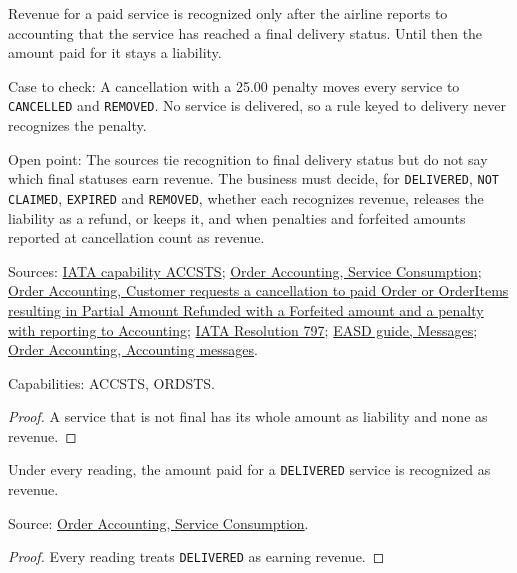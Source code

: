 \begin{theorem}
  \label{thm:accounting-revenue-at-final-status}
  Revenue for a paid service is recognized only after the airline reports to
  accounting that the service has reached a final delivery status. Until
  then the amount paid for it stays a liability.

  Case to check: A cancellation with a 25.00 penalty moves every service to
  \texttt{CANCELLED} and \texttt{REMOVED}. No service is delivered, so a
  rule keyed to delivery never recognizes the penalty.

  Open point: The sources tie recognition to final delivery status but do
  not say which final statuses earn revenue. The business must decide, for
  \texttt{DELIVERED}, \texttt{NOT CLAIMED}, \texttt{EXPIRED} and
  \texttt{REMOVED}, whether each recognizes revenue, releases the liability
  as a refund, or keeps it, and when penalties and forfeited amounts
  reported at cancellation count as revenue.

  Sources: \href{https://retailing.iata.org/armi/docs/ACCSTS/}{IATA capability ACCSTS};
  \href{https://standards.atlassian.net/wiki/spaces/OA/pages/579272705}{Order Accounting, Service Consumption};
  \href{https://standards.atlassian.net/wiki/spaces/OA/pages/844333143}{Order Accounting, Customer requests a cancellation to paid Order or OrderItems resulting in Partial Amount Refunded with a Forfeited amount and a penalty with reporting to Accounting};
  \href{https://www.iata.org/contentassets/72cbd60393ff42b5975d90ce9e049a7d/oneorder-resolution-797.pdf}{IATA Resolution 797};
  \href{https://standards.atlassian.net/wiki/spaces/EASD/pages/574652427/Messages}{EASD guide, Messages};
  \href{https://standards.atlassian.net/wiki/spaces/OA/pages/617185391}{Order Accounting, Accounting messages}.

  Capabilities: ACCSTS, ORDSTS.
\end{theorem}
\begin{proof}
  A service that is not final has its whole amount as liability and none as
  revenue.
\end{proof}

\begin{theorem}
  \label{thm:accounting-delivered-earns}
  Under every reading, the amount paid for a \texttt{DELIVERED} service is
  recognized as revenue.

  Source: \href{https://standards.atlassian.net/wiki/spaces/OA/pages/579272705}{Order Accounting, Service Consumption}.
\end{theorem}
\begin{proof}
  Every reading treats \texttt{DELIVERED} as earning revenue.
\end{proof}

